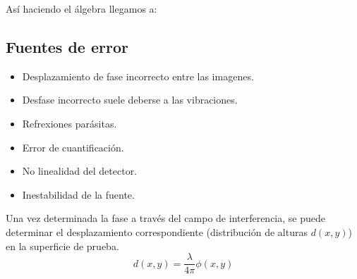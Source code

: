 \documentclass[12pt, letterpaper]{article}
\begin{document}
	Así haciendo el álgebra llegamos a:
	
	
	\subsection*{Fuentes de error}
	\begin{itemize}
		\item Desplazamiento de fase incorrecto entre las imagenes.
		\item Desfase incorrecto suele deberse a las vibraciones.
		\item Refrexiones parásitas.
		\item Error de cuantificación.
		\item No linealidad del detector.
		\item Inestabilidad de la fuente. 
	\end{itemize}
	
	
	Una vez determinada la fase a través del campo de interferencia, se puede determinar el desplazamiento correspondiente (distribución de alturas $d(x, y)$) en la superficie de prueba.
	$$ d(x, y) = \frac{\lambda}{4\pi}\phi(x, y) $$	

	
	
\end{document}
